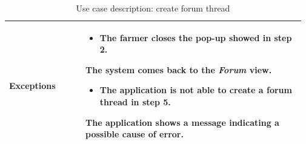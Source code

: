 \begin{table}[H]
\begin{tabular}{@{}p{0.25\linewidth} p{0.72\linewidth}@{}}
		\textbf{Exceptions}         & \begin{itemize}[leftmargin=.4cm,noitemsep,topsep=0pt,before=\vspace{-3mm}]
		   \item The farmer closes the pop-up showed in step 2.
		\end{itemize}
	    The system comes back to the \textit{Forum} view.
	    \begin{itemize}[leftmargin=.4cm,noitemsep,topsep=0pt]
		   \item The application is not able to create a forum thread in step 5. 
		\end{itemize}
		The application shows a message indicating a possible cause of error.
        \\\bottomrule
	\end{tabular}
	\caption{Use case description: create forum thread} 
\end{table}


